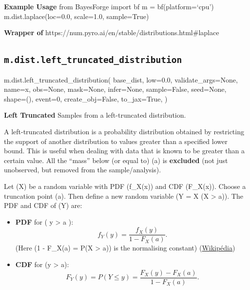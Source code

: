 \documentclass[
  letterpaper,
  DIV=11,
  numbers=noendperiod]{scrartcl}
\newenvironment{Shaded}{\begin{snugshade}}{\end{snugshade}}
\newcommand{\DecValTok}[1]{\textcolor[rgb]{0.68,0.00,0.00}{#1}}
\newcommand{\FloatTok}[1]{\textcolor[rgb]{0.68,0.00,0.00}{#1}}
\newcommand{\NormalTok}[1]{\textcolor[rgb]{0.00,0.23,0.31}{#1}}
\newcommand{\OperatorTok}[1]{\textcolor[rgb]{0.37,0.37,0.37}{#1}}
\newcommand{\StringTok}[1]{\textcolor[rgb]{0.13,0.47,0.30}{#1}}
\newcommand{\VariableTok}[1]{\textcolor[rgb]{0.07,0.07,0.07}{#1}}
\begin{document}
\textbf{Example Usage} from BayesForge import bf m = bf(platform=`cpu')
m.dist.laplace(loc=0.0, scale=1.0, sample=True)

\textbf{Wrapper of}
https://num.pyro.ai/en/stable/distributions.html\#laplace

\subsection{\texorpdfstring{\texttt{m.dist.left\_truncated\_distribution}}{m.dist.left\_truncated\_distribution}}\label{left_truncated_distribution}

\begin{Shaded}
\begin{Highlighting}[]
\NormalTok{m.dist.left\_truncated\_distribution(}
\NormalTok{    base\_dist,}
\NormalTok{    low}\OperatorTok{=}\FloatTok{0.0}\NormalTok{,}
\NormalTok{    validate\_args}\OperatorTok{=}\VariableTok{None}\NormalTok{,}
\NormalTok{    name}\OperatorTok{=}\StringTok{\textquotesingle{}x\textquotesingle{}}\NormalTok{,}
\NormalTok{    obs}\OperatorTok{=}\VariableTok{None}\NormalTok{,}
\NormalTok{    mask}\OperatorTok{=}\VariableTok{None}\NormalTok{,}
\NormalTok{    infer}\OperatorTok{=}\VariableTok{None}\NormalTok{,}
\NormalTok{    sample}\OperatorTok{=}\VariableTok{False}\NormalTok{,}
\NormalTok{    seed}\OperatorTok{=}\VariableTok{None}\NormalTok{,}
\NormalTok{    shape}\OperatorTok{=}\NormalTok{(),}
\NormalTok{    event}\OperatorTok{=}\DecValTok{0}\NormalTok{,}
\NormalTok{    create\_obj}\OperatorTok{=}\VariableTok{False}\NormalTok{,}
\NormalTok{    to\_jax}\OperatorTok{=}\VariableTok{True}\NormalTok{,}
\NormalTok{)}
\end{Highlighting}
\end{Shaded}

\textbf{Left Truncated} Samples from a left-truncated distribution.

A left-truncated distribution is a probability distribution obtained by
restricting the support of another distribution to values greater than a
specified lower bound. This is useful when dealing with data that is
known to be greater than a certain value. All the ``mass'' below (or
equal to) (a) is \textbf{excluded} (not just unobserved, but removed
from the sample/analysis).

Let (X) be a random variable with PDF (f\_X(x)) and CDF (F\_X(x)).
Choose a truncation point (a). Then define a new random variable (Y = X
\mid (X \textgreater{} a)). The PDF and CDF of (Y) are:

\begin{itemize}
\item
  \textbf{PDF} for ( y \textgreater{} a ): \[
    f_Y(y) = \frac{f_X(y)}{1 - F_X(a)} .
    \] (Here (1 - F\_X(a) = P(X \textgreater{} a)) is the normalising
  constant)
  (\href{https://en.wikipedia.org/wiki/Matrix_normal_distribution}{Wikipédia})
\item
  \textbf{CDF} for (y \textgreater{} a): \[
    F_Y(y) = P(Y \le y) = \frac{F_X(y) - F_X(a)}{1 - F_X(a)} .
    \]
\end{itemize}
\end{document}
